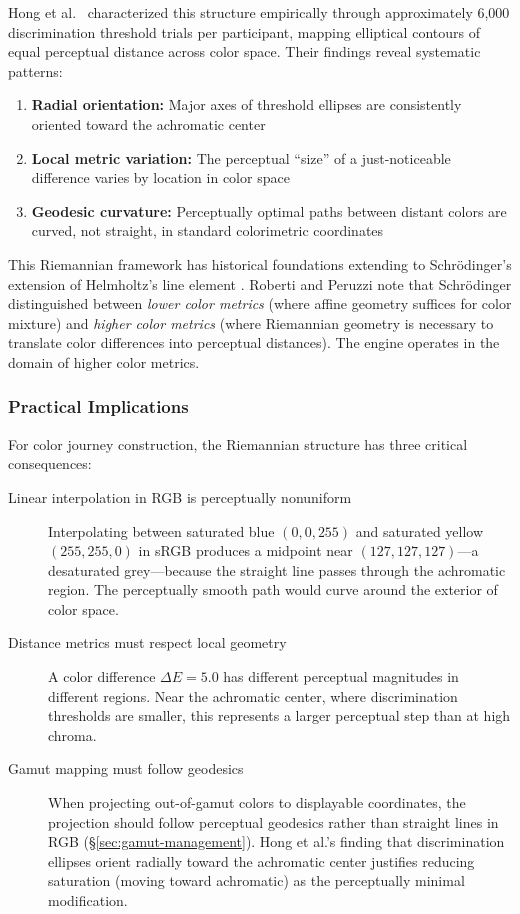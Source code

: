 Hong et al.\ \citeyearpar{hong2024} characterized this structure empirically through approximately 6,000 discrimination threshold trials per participant, mapping elliptical contours of equal perceptual distance across color space. Their findings reveal systematic patterns:

\begin{enumerate}
    \item \textbf{Radial orientation:} Major axes of threshold ellipses are consistently oriented toward the achromatic center \citep{hong2024}
    \item \textbf{Local metric variation:} The perceptual ``size'' of a just-noticeable difference varies by location in color space
    \item \textbf{Geodesic curvature:} Perceptually optimal paths between distant colors are curved, not straight, in standard colorimetric coordinates
\end{enumerate}

This Riemannian framework has historical foundations extending to Schrödinger's extension of Helmholtz's line element \citep{roberti2023}. Roberti and Peruzzi \citeyearpar{roberti2023} note that Schrödinger distinguished between \emph{lower color metrics} (where affine geometry suffices for color mixture) and \emph{higher color metrics} (where Riemannian geometry is necessary to translate color differences into perceptual distances). The engine operates in the domain of higher color metrics.

\subsubsection{Practical Implications}

For color journey construction, the Riemannian structure has three critical consequences:

\begin{description}
    \item[Linear interpolation in RGB is perceptually nonuniform] Interpolating between saturated blue $(0, 0, 255)$ and saturated yellow $(255, 255, 0)$ in sRGB produces a midpoint near $(127, 127, 127)$—a desaturated grey—because the straight line passes through the achromatic region. The perceptually smooth path would curve around the exterior of color space.
    
    \item[Distance metrics must respect local geometry] A color difference $\Delta E = 5.0$ has different perceptual magnitudes in different regions. Near the achromatic center, where discrimination thresholds are smaller, this represents a larger perceptual step than at high chroma.
    
    \item[Gamut mapping must follow geodesics] When projecting out-of-gamut colors to displayable coordinates, the projection should follow perceptual geodesics rather than straight lines in RGB (\S\ref{sec:gamut-management}). Hong et al.'s finding that discrimination ellipses orient radially toward the achromatic center \citep{hong2024} justifies reducing saturation (moving toward achromatic) as the perceptually minimal modification.
\end{description}

